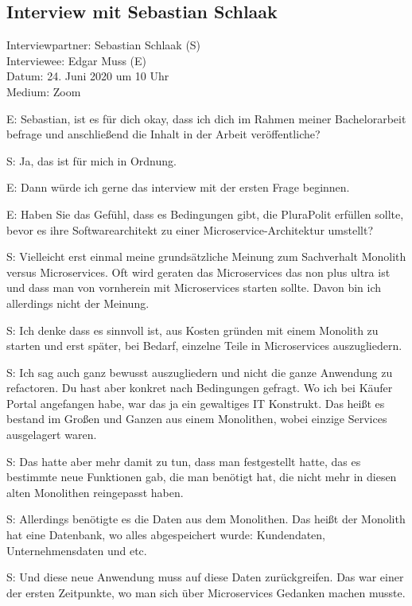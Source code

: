 
\subsection{Interview mit Sebastian Schlaak}
\label{appendix:schlaak}

Interviewpartner: Sebastian Schlaak (S) \\
Interviewee: Edgar Muss (E) \\
Datum: 24. Juni 2020 um 10 Uhr \\
Medium: Zoom

E: Sebastian, ist es für dich okay, dass ich dich im Rahmen meiner Bachelorarbeit befrage und anschließend die Inhalt in der Arbeit veröffentliche?

S: Ja, das ist für mich in Ordnung.

E: Dann würde ich gerne das interview mit der ersten Frage beginnen. 

E: Haben Sie das Gefühl, dass es Bedingungen gibt, die PluraPolit erfüllen sollte, bevor es ihre Softwarearchitekt zu einer Microservice-Architektur umstellt?

S: Vielleicht erst einmal meine grundsätzliche Meinung zum Sachverhalt Monolith versus Microservices. Oft wird geraten das Microservices das non plus ultra ist und dass man von vornherein mit Microservices starten sollte. Davon bin ich allerdings nicht der Meinung.

 \label{appendix:s-1}  \label{appendix:s-2}
S: Ich denke dass es sinnvoll ist, aus Kosten gründen mit einem Monolith zu starten und erst später, bei Bedarf, einzelne Teile in Microservices auszugliedern. 

S: Ich sag auch ganz bewusst auszugliedern und nicht die ganze Anwendung zu refactoren. Du hast aber konkret nach Bedingungen gefragt. Wo ich bei Käufer Portal angefangen habe, war das ja ein gewaltiges IT Konstrukt. Das heißt es bestand im Großen und Ganzen aus einem Monolithen, wobei einzige Services ausgelagert waren.

 \label{appendix:s-3}
S: Das hatte aber mehr damit zu tun, dass man festgestellt hatte, das es bestimmte neue Funktionen gab, die man benötigt hat, die nicht mehr in diesen alten Monolithen reingepasst haben. 

S: Allerdings benötigte es die Daten aus dem Monolithen. Das heißt der Monolith hat eine Datenbank, wo alles abgespeichert wurde: Kundendaten, Unternehmensdaten und etc.

 \label{appendix:s-4}
S: Und diese neue Anwendung muss auf diese Daten zurückgreifen. Das war einer der ersten Zeitpunkte, wo man sich über Microservices Gedanken machen musste.

